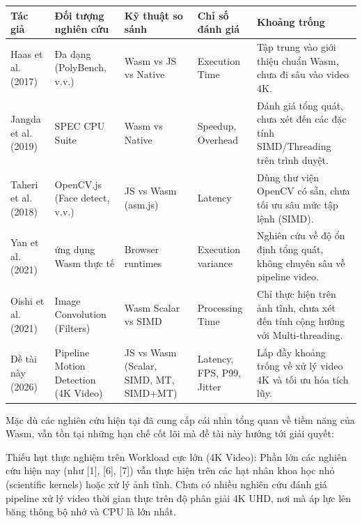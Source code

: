 \begin{center}
\small
\renewcommand{\arraystretch}{1.2}
\begin{tabularx}{\textwidth}{|>{\raggedright\arraybackslash}X|>{\raggedright\arraybackslash}X|>{\raggedright\arraybackslash}X|>{\raggedright\arraybackslash}X|>{\raggedright\arraybackslash}X|}
\hline
\textbf{Tác giả} & \textbf{Đối tượng nghiên cứu} & \textbf{Kỹ thuật so sánh} & \textbf{Chỉ số đánh giá} & \textbf{Khoảng trống} \\
\hline
Haas et al. (2017) & Đa dạng (PolyBench, v.v.) & Wasm vs JS vs Native & Execution Time & Tập trung vào giới thiệu chuẩn Wasm, chưa đi sâu vào video 4K. \\
\hline
Jangda et al. (2019) & SPEC CPU Suite & Wasm vs Native & Speedup, Overhead & Đánh giá tổng quát, chưa xét đến các đặc tính SIMD/Threading trên trình duyệt. \\
\hline
Taheri et al. (2018) & OpenCV.js (Face detect, v.v.) & JS vs Wasm (asm.js) & Latency & Dùng thư viện OpenCV có sẵn, chưa tối ưu sâu mức tập lệnh (SIMD). \\
\hline
Yan et al. (2021) & 150 ứng dụng Wasm thực tế & Browser runtimes & Execution variance & Nghiên cứu về độ ổn định tổng quát, không chuyên sâu về pipeline video. \\
\hline
Oishi et al. (2021) & Image Convolution (Filters) & Wasm Scalar vs SIMD & Processing Time & Chỉ thực hiện trên ảnh tĩnh, chưa xét đến tính cộng hưởng với Multi-threading. \\
\hline
Đề tài này (2026) & Pipeline Motion Detection (4K Video) & JS vs Wasm (Scalar, SIMD, MT, SIMD+MT) & Latency, FPS, P99, Jitter & Lấp đầy khoảng trống về xử lý video 4K và tối ưu hóa tích lũy. \\
\hline
\end{tabularx}
\end{center}
\normalsize


Mặc dù các nghiên cứu hiện tại đã cung cấp cái nhìn tổng quan về tiềm năng của Wasm, vẫn tồn tại những hạn chế cốt lõi mà đề tài này hướng tới giải quyết:


Thiếu hụt thực nghiệm trên Workload cực lớn (4K Video): Phần lớn các nghiên cứu hiện nay (như [1], [6], [7]) vẫn thực hiện trên các hạt nhân khoa học nhỏ (scientific kernels) hoặc xử lý ảnh tĩnh. Chưa có nhiều nghiên cứu đánh giá pipeline xử lý video thời gian thực trên độ phân giải 4K UHD, nơi mà áp lực lên băng thông bộ nhớ và CPU là lớn nhất.


